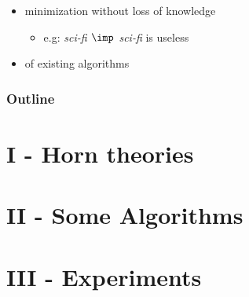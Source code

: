 \documentclass{beamer}
\begin{document}
{{\begin{frame}
\begin{itemize}
	\item minimization without loss of knowledge
	\begin{itemize}
		\item[] {\color{midnight} e.g: \textit{sci-fi $\imp$ sci-fi} is useless}
	\end{itemize}
	
	\vspace{1.2em}
	
	\item {} of existing algorithms
\end{itemize}

\end{frame}



\begin{frame}
\frametitle{Outline}
\tableofcontents

\end{frame}
}}



\section{I - Horn theories}


\section{II - Some Algorithms}


\section{III - Experiments}

\end{document}
